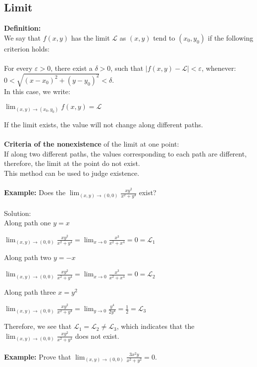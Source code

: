 \documentclass[UTF8,a4paper, 10pt, openany]{svmono}
\begin{document}
\subsection{Limit}
\textbf{Definition:}\\
We say that $f(x,y)$ has the limit $\mathcal{L}$ as $(x,y)$ tend to $(x_0,y_0)$ if the following criterion holds:
\\ \\For every $\varepsilon > 0$, there exist a $\delta >0$, such that $|f(x,y)-\mathcal{L}|<\varepsilon $, whenever: $0<\sqrt{(x-x_0)^2+(y-y_0)^2}<\delta$. \\
In this case, we write:
\begin{center}
$\displaystyle\lim_{(x,y) \to (x_0,y_0)} f(x,y) = \mathcal{L}$
\end{center}
If the limit exists, the value will not change along different paths.\\ \\
\textbf{Criteria of the nonexistence} of the limit at one point:\\
If along two different paths, the values corresponding to each path are different, therefore, the limit at the point do not exist.\\
This method can be used to judge existence.\\ \\
\textbf{Example:} Does the $\displaystyle\lim_{(x,y) \to (0,0)} \frac{xy^2}{x^2+y^4}$ exist?\\ \\Solution:\\
Along path one $y=x$
\begin{center}
$\displaystyle\lim_{(x,y) \to (0,0)} \frac{xy^2}{x^2+y^4}=\displaystyle\lim_{x \to 0} \frac{x^3}{x^2+x^4}=0=\mathcal{L}_1$
\end{center}
Along path two $y=-x$
\begin{center}
$\displaystyle\lim_{(x,y) \to (0,0)} \frac{xy^2}{x^2+y^4}=\displaystyle\lim_{x \to 0} \frac{x^3}{x^2+x^4}=0=\mathcal{L}_2$
\end{center}
Along path three $x=y^2$
\begin{center}
$\displaystyle\lim_{(x,y) \to (0,0)} \frac{xy^2}{x^2+y^4}=\displaystyle\lim_{y \to 0}\frac{y^4}{2y^4}=\frac{1}{2}=\mathcal{L}_3$
\end{center}
Therefore, we see that $\mathcal{L}_1=\mathcal{L}_2 \neq \mathcal{L}_3$, which indicates that the $\lim_{(x,y) \to (0,0)} \frac{xy^2}{x^2+y^4}$ does not exist.\\ \\
\textbf{Example:}  Prove that $\displaystyle\lim_{(x,y) \to (0,0)} \frac{3x^2y }{x^2+y^2}=0$.\\ \\
\end{document}
